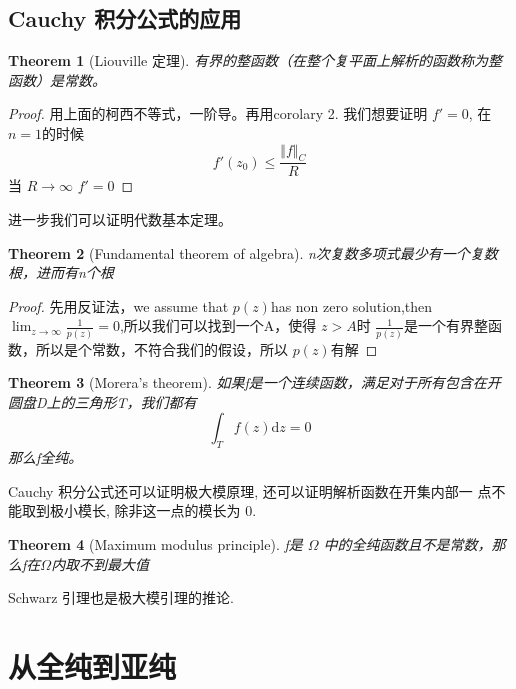 \documentclass{article}
\newtheorem{theorem}{Theorem}
\begin{document}
\subsection{Cauchy 积分公式的应用}

\begin{theorem}[Liouville 定理]
    有界的整函数（在整个复平面上解析的函数称为整函数）是常数。
\end{theorem}
\begin{proof}
    用上面的柯西不等式，一阶导。再用corolary 2.
    我们想要证明 $ f'=0 $, 在$ n=1 $的时候
    \begin{equation*}
        f'(z_0)\leqslant \frac{\Vert f \Vert_C}{R}
    \end{equation*}
    当 $ R\rightarrow\infty $ $ f'=0 $
\end{proof}

进一步我们可以证明代数基本定理。
\begin{theorem}[Fundamental theorem of algebra]
    n次复数多项式最少有一个复数根，进而有n个根
\end{theorem}

\begin{proof}
    先用反证法，we assume that $ p(z) $has non zero solution,then $ \lim_{z\rightarrow \infty}\frac{1}{p(z)}=0 $,所以我们可以找到一个A，使得 $ z> A $时 $\frac{1}{p(z)} $是一个有界整函数，所以是个常数，不符合我们的假设，所以 $ p(z) $有解
\end{proof}
\begin{theorem}[Morera’s theorem]
    如果f是一个连续函数，满足对于所有包含在开圆盘D上的三角形T，我们都有
    \begin{equation*}
        \int_{T}^{}f(z)\mathrm{d}z=0
    \end{equation*}
    那么f全纯。
\end{theorem}



Cauchy 积分公式还可以证明极大模原理, 还可以证明解析函数在开集内部一
点不能取到极小模长, 除非这一点的模长为 0.
\begin{theorem}[Maximum modulus principle]
    f是 $ \Omega $ 中的全纯函数且不是常数，那么f在$ \Omega $内取不到最大值
\end{theorem}

Schwarz 引理也是极大模引理的推论.
\newpage
\section{从全纯到亚纯}
\end{document}
